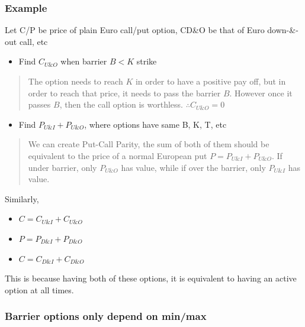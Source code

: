 \documentclass[
  oneside]{book}
\providecommand{\tightlist}{%
  \setlength{\itemsep}{0pt}\setlength{\parskip}{0pt}}
\begin{document}
\hypertarget{example-4}{%
\subsubsection{Example}\label{example-4}}

Let C/P be price of plain Euro call/put option, CD\&O be that of Euro down-\&-out call, etc

\begin{itemize}
\tightlist
\item
  Find \(C_{U\&O}\) when barrier \(B < K\) strike
\end{itemize}

\begin{quote}
The option needs to reach \(K\) in order to have a positive pay off, but in order to reach that price, it needs to pass the barrier \(B\). However once it passes \(B\), then the call option is worthless. \(\therefore C_{U\&O} = 0\)
\end{quote}

\begin{itemize}
\tightlist
\item
  Find \(P_{U\&I}+P_{U\&O}\), where options have same B, K, T, etc
\end{itemize}

\begin{quote}
We can create Put-Call Parity, the sum of both of them should be equivalent to the price of a normal European put \(P=P_{U\&I}+P_{U\&O}\). If under barrier, only \(P_{U\&O}\) has value, while if over the barrier, only \(P_{U\&I}\) has value.
\end{quote}

Similarly,

\begin{itemize}
\tightlist
\item
  \(C=C_{U\&I}+C_{U\&O}\)
\item
  \(P=P_{D\&I}+P_{D\&O}\)
\item
  \(C=C_{D\&I}+C_{D\&O}\)
\end{itemize}

This is because having both of these options, it is equivalent to having an active option at all times.

\hypertarget{barrier-options-only-depend-on-minmax}{%
\subsubsection{Barrier options only depend on min/max}\label{barrier-options-only-depend-on-minmax}}
\end{document}
